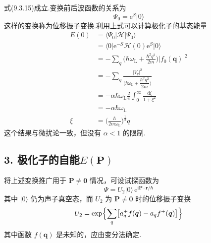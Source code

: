 式(9.3.15)成立.变换前后波函数的关系为
\begin{equation}
  \varPsi_{0}=\mathrm{e}^{S}|0\rangle
\end{equation}
这样的变换称为位移振子变换.利用上式可以计算极化子的基态能量
\begin{equation}
\begin{aligned}
  E(0)&=\langle\varPsi_{0}|\mathscr{H}|\varPsi_{0}\rangle\\
  &=\bigl\langle 0\bigl|\mathrm{e}^{-S}\mathscr{H}(0)\mathrm{e}^{S}\bigr|0\bigr\rangle\\
  &=-\sum_{q}\biggl(\hbar\omega_{\mathrm L}
  +\frac{\hbar^{2}q^{2}}{2m}\biggr)\bigl|f_{0}(\boldsymbol{q})\bigr|^{2}\\
  &=-\sum_{q}\frac{\bigl|V_{q}\bigr|^{2}}{\biggl(\hbar\omega_{\mathrm L}
  +\dfrac{\hbar^{2}q^{2}}{2m}\biggr)}\\
  &=-\alpha\hbar\omega_{\mathrm L}\frac{2}{\pi}
  \int_{0}^{\infty}\frac{\mathrm{d}\xi}{1+\xi^{2}}\\
  &=-\alpha\hbar\omega_{\mathrm L}\\
  \xi&=\biggl(\frac{\hbar}{2m\omega_{\mathrm L}}\biggr)^{\frac{1}{2}}q
\end{aligned}
\end{equation}
这个结果与微扰论一致，但没有 $\alpha<1$ 的限制.

\subsection*{3. 极化子的自能$E(\boldsymbol{P})$}

将上述变换推广用于 $\boldsymbol{P}\neq\boldsymbol{0}$ 情况，可设试探函数为
\begin{equation}
  \varPsi=U_{2}|0\rangle\,\mathrm{e}^{\mathrm{i}\boldsymbol{P}\cdot\boldsymbol{r}/\hbar}
\end{equation}
其中 $|0\rangle$ 仍为声子真空态，而 $U_{2}$ 为 $\boldsymbol{P}\neq\boldsymbol{0}$ 时的位移振子变换
\begin{equation}
  U_{2}=\exp\Bigl\{\sum_{q}\bigl[a_{q}^{+}f(\boldsymbol{q})
  -a_{q}f^{+}(\boldsymbol{q})\bigr]\Bigr\}
\end{equation}
其中函数 $f(\boldsymbol{q})$ 是未知的，应由变分法确定.

